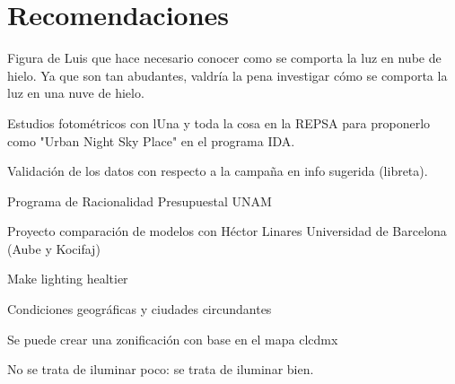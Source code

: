 \chapter{Recomendaciones}
\label{chap:recomendaciones}
 

Figura de Luis que hace necesario conocer como se comporta la luz en nube de hielo. Ya que son tan abudantes, valdría la pena investigar cómo se comporta la luz en una nuve de hielo. 

Estudios fotométricos con lUna y toda la cosa en la REPSA para proponerlo como "Urban Night Sky Place" en el programa IDA.

Validación de los datos con respecto a la campaña en info sugerida (libreta).

Programa de Racionalidad Presupuestal UNAM

Proyecto comparación de modelos con Héctor Linares Universidad de Barcelona (Aube y Kocifaj)

Make lighting healtier

Condiciones geográficas y ciudades circundantes

Se puede crear una zonificación con base en el mapa clcdmx

No se trata de iluminar poco: se trata de iluminar bien.